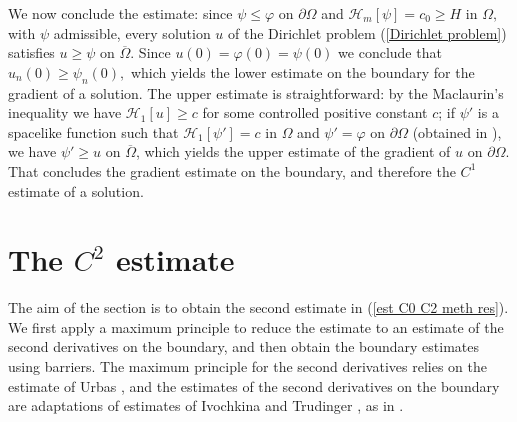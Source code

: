 \documentclass[10pt,reqno,oneside]{amsart}
\theoremstyle{definition}
\theoremstyle{remark}
\begin{document}
We now conclude the estimate: since $\psi\leq\varphi$ on $\partial\Omega$ and $\mathcal{H}_m[\psi]=c_0\geq H$ in $\Omega,$ with $\psi$ admissible, every solution $u$ of the Dirichlet problem (\ref{Dirichlet problem}) satisfies $u\geq\psi$ on $\overline{\Omega}.$ Since $u(0)=\varphi(0)=\psi(0)$ we conclude that $u_n(0)\geq\psi_n(0),$ which yields the lower estimate on the boundary for the gradient of a solution. The upper estimate is straightforward: by the Maclaurin's inequality we have $\mathcal{H}_1[u]\geq c$ for some controlled positive constant $c$; if $\psi'$ is a spacelike function such that $\mathcal{H}_1[\psi']=c$ in $\Omega$ and $\psi'=\varphi$ on $\partial\Omega$ (obtained in \cite{Bar}), we have $\psi'\geq u$ on $\overline{\Omega}$, which yields the upper estimate of the gradient of $u$ on $\partial\Omega.$ That concludes the gradient estimate on the boundary, and therefore the $C^1$ estimate of a solution.

\section{The $C^2$ estimate}\label{section C2}
The aim of the section is to obtain the second estimate in (\ref{est C0 C2 meth res}). We first apply a maximum principle to reduce the estimate to an estimate of the second derivatives on the boundary, and then obtain the boundary estimates using barriers. The maximum principle for the second derivatives relies on the estimate of Urbas \cite{Ur}, and the estimates of the second derivatives on the boundary are adaptations of estimates of Ivochkina \cite{Iv1,Iv2} and Trudinger \cite{Tr95}, as in \cite{Bay1}. 
\end{document}
